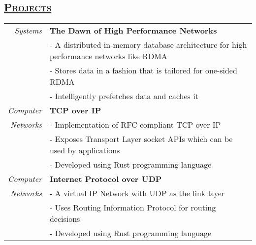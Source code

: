 \documentclass[14pt]{article}
\begin{document}
\subsection* {\scshape\Large\uline {Projects}}
\begin{tabularx}{\textwidth}{r X}
\emph{Systems}  & \textbf{The Dawn of High Performance Networks} \\
	        & - A distributed in-memory database architecture for high performance networks like RDMA \\
		& - Stores data in a fashion that is tailored for one-sided RDMA \\
		& - Intelligently prefetches data and caches it \\
\emph{Computer} & \textbf{TCP over IP} \\
\emph{Networks} &  - Implementation of RFC compliant TCP over IP\\
                             & - Exposes Transport Layer socket APIs which can be used by applications\\
                             & - Developed using Rust programming language \\
\emph{Computer} & \textbf{Internet Protocol over UDP} \\
\emph{Networks} & - A virtual IP Network with UDP as the link layer\\
                             & - Uses Routing Information Protocol for routing decisions\\
                             & - Developed using Rust programming language\\
\end{tabularx}
\end{document}
